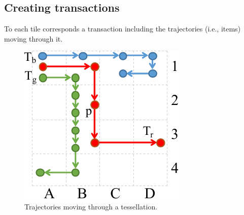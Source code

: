 \documentclass[
]{ceurart}
\begin{document}
\subsection{Creating transactions}
To each tile corresponds a transaction including the trajectories (i.e., items) moving through it.
%
\begin{figure}[t]
    \centering
    \includegraphics[scale=.6]{patterns2.pdf}
    \caption{Trajectories moving through a tessellation.}
    \label{fig:patterns2}
\end{figure}
\end{document}
